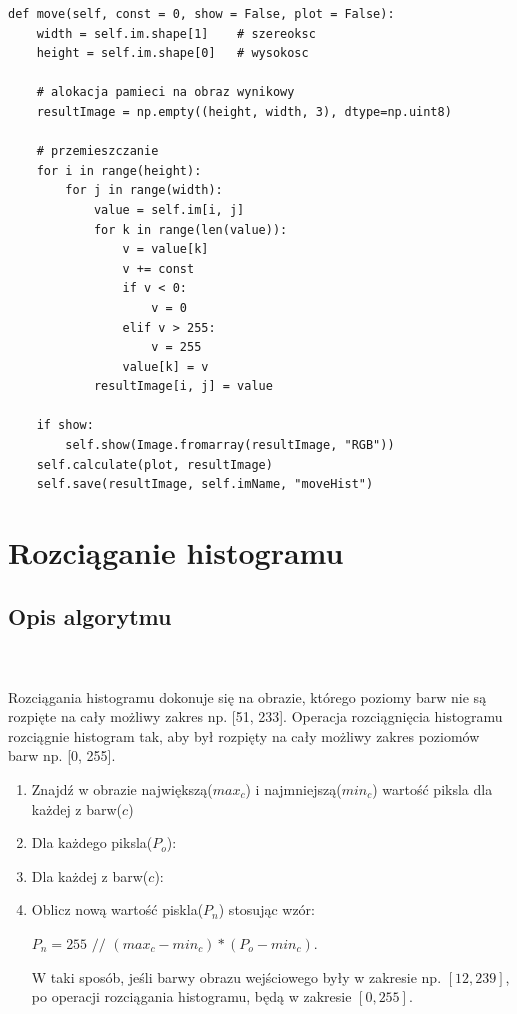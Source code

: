 \documentclass[final,a4paper,openany,12pt]{mwbk}
\begin{document}

\begin{lstlisting}[caption=Przemieszczanie histogramu]
def move(self, const = 0, show = False, plot = False):
	width = self.im.shape[1]    # szereoksc
	height = self.im.shape[0]   # wysokosc
	
	# alokacja pamieci na obraz wynikowy
	resultImage = np.empty((height, width, 3), dtype=np.uint8)
	
	# przemieszczanie
	for i in range(height):
		for j in range(width):
			value = self.im[i, j]
			for k in range(len(value)):
				v = value[k]
				v += const
				if v < 0:
					v = 0
				elif v > 255:
					v = 255
				value[k] = v
			resultImage[i, j] = value
	
	if show:
		self.show(Image.fromarray(resultImage, "RGB"))
	self.calculate(plot, resultImage)
	self.save(resultImage, self.imName, "moveHist")
\end{lstlisting}

\newpage

\section{Rozciąganie histogramu}
\subsection*{Opis algorytmu}
\hfill
\\\\
\indent  Rozciągania histogramu dokonuje się na obrazie, którego poziomy barw nie są rozpięte na cały możliwy zakres np.
[51, 233]. Operacja rozciągnięcia histogramu rozciągnie histogram tak, aby był rozpięty na cały możliwy zakres poziomów barw np. [0, 255].
\begin{enumerate}
	\item Znajdź w obrazie największą($max_c$) i najmniejszą($min_c$) wartość piksla dla każdej z barw($c$)
	\item Dla każdego piksla($P_o$):
	\item Dla każdej z barw($c$):
	\item Oblicz nową wartość piskla($P_n$) stosując wzór:\\
	\centerline{$P_n = 255$ $//$ $(max_c - min_c) * (P_o - min_c)$.}
	W taki sposób, jeśli barwy obrazu wejściowego były w zakresie
	np. $[12, 239]$, po operacji rozciągania histogramu, będą w zakresie $[0, 255]$.
\end{enumerate}
\end{document}

